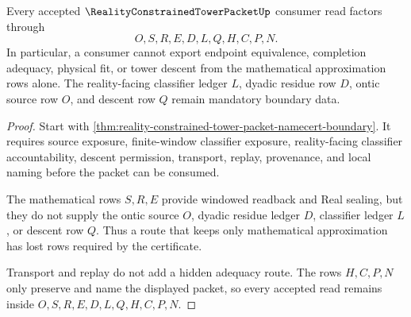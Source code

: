 \begin{theorem}
\label{thm:reality-constrained-tower-packet-nonescape}
Every accepted $\RealityConstrainedTowerPacketUp$ consumer read factors through
$$
O,S,R,E,D,L,Q,H,C,P,N.
$$
In particular, a consumer cannot export endpoint equivalence, completion adequacy, physical fit, or tower descent from the mathematical approximation rows alone. The reality-facing classifier ledger $L$, dyadic residue row $D$, ontic source row $O$, and descent row $Q$ remain mandatory boundary data.
\end{theorem}
\begin{proof}
Start with \autoref{thm:reality-constrained-tower-packet-namecert-boundary}. It requires source exposure, finite-window classifier exposure, reality-facing classifier accountability, descent permission, transport, replay, provenance, and local naming before the packet can be consumed.

The mathematical rows $S,R,E$ provide windowed readback and Real sealing, but they do not supply the ontic source $O$, dyadic residue ledger $D$, classifier ledger $L$, or descent row $Q$. Thus a route that keeps only mathematical approximation has lost rows required by the certificate.

Transport and replay do not add a hidden adequacy route. The rows $H,C,P,N$ only preserve and name the displayed packet, so every accepted read remains inside $O,S,R,E,D,L,Q,H,C,P,N$.
\end{proof}

